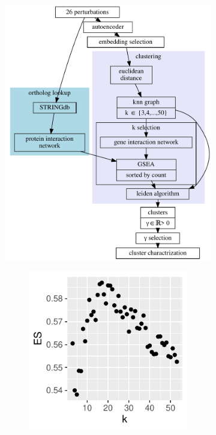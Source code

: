 \documentclass{article}
\begin{document}
\begin{figure}
	\begin{subfigure}[b]{0.4\textwidth}
		\includegraphics[width=\textwidth]{cluster.dot.pdf}
		\caption{}
		\label{fig:}
	\end{subfigure}
	\begin{subfigure}[b]{0.2\textwidth}
		\begin{subfigure}[b]{\textwidth}
			\includegraphics[width=\textwidth]{es.pdf}


\end{subfigure}
\end{subfigure}
\end{figure}
\end{document}
